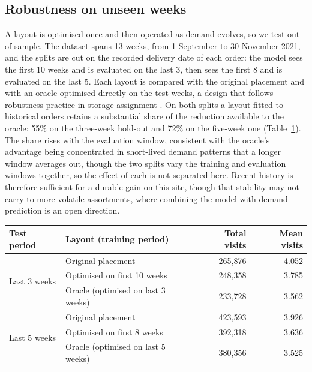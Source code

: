 \documentclass[]{interact}
\begin{document}
\subsection{Robustness on unseen weeks}
A layout is optimised once and then operated as demand evolves, so we test out of sample. The dataset spans 13 weeks, from 1 September to 30 November 2021, and the splits are cut on the recorded delivery date of each order: the model sees the first 10 weeks and is evaluated on the last 3, then sees the first 8 and is evaluated on the last 5. Each layout is compared with the original placement and with an oracle optimised directly on the test weeks, a design that follows robustness practice in storage assignment \citep{lee2020cie, wang2020}. On both splits a layout fitted to historical orders retains a substantial share of the reduction available to the oracle: 55\% on the three-week hold-out and 72\% on the five-week one (Table~\ref{tab:temporal}). The share rises with the evaluation window, consistent with the oracle's advantage being concentrated in short-lived demand patterns that a longer window averages out, though the two splits vary the training and evaluation windows together, so the effect of each is not separated here. Recent history is therefore sufficient for a durable gain on this site, though that stability may not carry to more volatile assortments, where combining the model with demand prediction is an open direction.

\begin{table}[H]
\centering
{}
{\begin{tabular*}{\textwidth}{@{\extracolsep{\fill}}llrr@{}}
\toprule
Test period & Layout (training period) & Total visits & Mean visits \\
\midrule
\multirow{3}{*}{Last 3 weeks}
 & Original placement & 265{,}876 & 4.052 \\
 & Optimised on first 10 weeks & 248{,}358 & 3.785 \\
 & Oracle (optimised on last 3 weeks) & 233{,}728 & 3.562 \\
\midrule
\multirow{3}{*}{Last 5 weeks}
 & Original placement & 423{,}593 & 3.926 \\
 & Optimised on first 8 weeks & 392{,}318 & 3.636 \\
 & Oracle (optimised on last 5 weeks) & 380{,}356 & 3.525 \\
\bottomrule
\end{tabular*}}
\label{tab:temporal}
\end{table}
\end{document}
